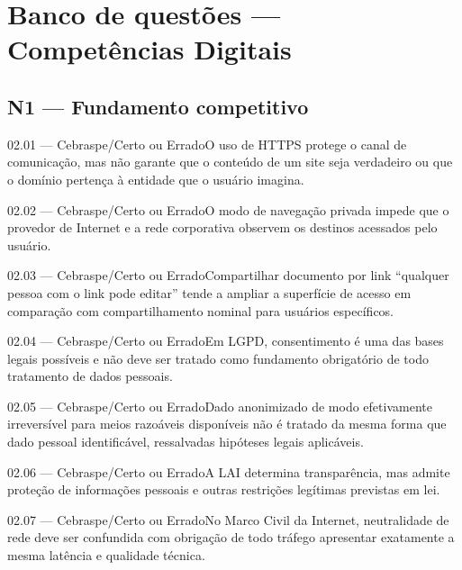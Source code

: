 \section{Banco de questões — Competências Digitais}

\subsection*{N1 — Fundamento competitivo}
\begin{questao}{ 02.01 — Cebraspe/Certo ou Errado}O uso de HTTPS protege o canal de comunicação, mas não garante que o conteúdo de um site seja verdadeiro ou que o domínio pertença à entidade que o usuário imagina.\end{questao}
\begin{questao}{ 02.02 — Cebraspe/Certo ou Errado}O modo de navegação privada impede que o provedor de Internet e a rede corporativa observem os destinos acessados pelo usuário.\end{questao}
\begin{questao}{ 02.03 — Cebraspe/Certo ou Errado}Compartilhar documento por link ``qualquer pessoa com o link pode editar'' tende a ampliar a superfície de acesso em comparação com compartilhamento nominal para usuários específicos.\end{questao}
\begin{questao}{ 02.04 — Cebraspe/Certo ou Errado}Em LGPD, consentimento é uma das bases legais possíveis e não deve ser tratado como fundamento obrigatório de todo tratamento de dados pessoais.\end{questao}
\begin{questao}{ 02.05 — Cebraspe/Certo ou Errado}Dado anonimizado de modo efetivamente irreversível para meios razoáveis disponíveis não é tratado da mesma forma que dado pessoal identificável, ressalvadas hipóteses legais aplicáveis.\end{questao}
\begin{questao}{ 02.06 — Cebraspe/Certo ou Errado}A LAI determina transparência, mas admite proteção de informações pessoais e outras restrições legítimas previstas em lei.\end{questao}
\begin{questao}{ 02.07 — Cebraspe/Certo ou Errado}No Marco Civil da Internet, neutralidade de rede deve ser confundida com obrigação de todo tráfego apresentar exatamente a mesma latência e qualidade técnica.\end{questao}
